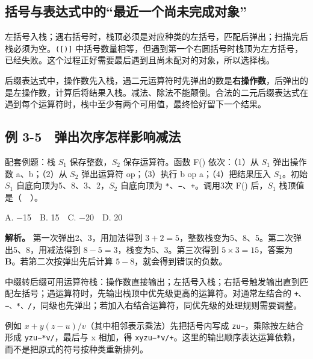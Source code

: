\subsection{括号与表达式中的``最近一个尚未完成对象''}\label{DS03-detail2}

左括号入栈；遇右括号时，栈顶必须是对应种类的左括号，匹配后弹出；扫描完后栈必须为空。\texttt{(\allowbreak{}[)\allowbreak{}]} 中括号数量相等，但遇到第一个右圆括号时栈顶为左方括号，已经失败。这个过程正好需要最后遇到且尚未配对的对象，所以选择栈。

后缀表达式中，操作数先入栈，遇二元运算符时先弹出的数是\textbf{右操作数}，后弹出的是左操作数，计算后将结果入栈。减法、除法不能颠倒。合法的二元后缀表达式在遇到每个运算符时，栈中至少有两个可用值，最终恰好留下一个结果。

\subsection{例 3-5　弹出次序怎样影响减法}\label{DS03-ex5}

\begin{example}[配套例题]

配套例题：栈 \(S_1\) 保存整数，\(S_2\) 保存运算符。函数 F() 依次：（1）从 \(S_1\) 弹出操作数 a、b；（2）从 \(S_2\) 弹出运算符 op；（3）执行 b op a；（4）把结果压入 \(S_1\)。初始 \(S_1\) 自底向顶为5、8、3、2，\(S_2\) 自底向顶为 \texttt{*\allowbreak{}}、\texttt{−}、\texttt{+\allowbreak{}}。调用3次 F() 后，\(S_1\) 栈顶值是（　）。

A. \ensuremath{-}15　B. 15　C. \ensuremath{-}20　D. 20

\end{example}

\textbf{解析。} 第一次弹出2、3，用加法得到 \(3+2=5\)，整数栈变为5、8、5。第二次弹出5、8，用减法得到 \(8-5=3\)，栈变为5、3。第三次得到 \(5\times3=15\)，答案为 \textbf{B}。若第二次按弹出先后计算 \(5-8\)，就会得到错误的负数。

中缀转后缀可用运算符栈：操作数直接输出；左括号入栈；右括号触发输出直到匹配左括号；遇运算符时，先输出栈顶中优先级更高的运算符。对通常左结合的 \texttt{+\allowbreak{}、−、*\allowbreak{}、/\allowbreak{}}，同级也先弹出；若加入右结合运算符，同优先级的处理规则需要调整。

例如 \(x+y(z-u)/v\)（其中相邻表示乘法）先把括号内写成 \texttt{zu−}，乘除按左结合形成 \texttt{yzu−*\allowbreak{}v/\allowbreak{}}，最后与 x 相加，得 \texttt{xyzu−*\allowbreak{}v/\allowbreak{}+\allowbreak{}}。这里的输出顺序表达运算依赖，而不是把原式的符号按种类重新排列。

